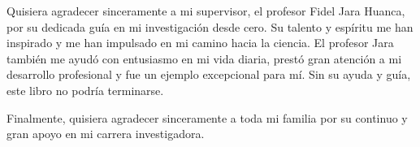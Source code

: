 %
%


Quisiera agradecer sinceramente a mi supervisor, el profesor Fidel
Jara Huanca, por su dedicada guía en mi investigación desde cero.
Su talento y espíritu me han inspirado y me han impulsado en mi
camino hacia la ciencia.
El profesor Jara también me ayudó con entusiasmo en mi vida diaria,
prestó gran atención a mi desarrollo profesional y fue un ejemplo
excepcional para mí.
Sin su ayuda y guía, este libro no podría terminarse.

Finalmente, quisiera agradecer sinceramente a toda mi familia por su
continuo y gran apoyo en mi carrera investigadora.

